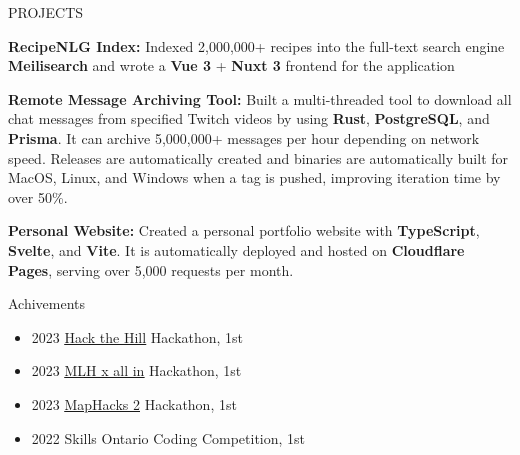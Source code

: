 \documentclass{resume}
\begin{document}
\begin{rSection}{PROJECTS}
	\vspace{-1.25em}

	\item \textbf{RecipeNLG Index:} {Indexed 2,000,000+ recipes into the full-text search engine \textbf{Meilisearch} and wrote a \textbf{Vue 3} + \textbf{Nuxt 3} frontend for the application}

	\item \textbf{Remote Message Archiving Tool:} {Built a multi-threaded tool to download all chat messages from specified Twitch videos by using \textbf{Rust}, \textbf{PostgreSQL}, and \textbf{Prisma}. It can archive 5,000,000+ messages per hour depending on network speed. Releases are automatically created and binaries are automatically built for MacOS, Linux, and Windows when a tag is pushed, improving iteration time by over 50\%.}

	\item \textbf{Personal Website:} {Created a personal portfolio website with \textbf{TypeScript}, \textbf{Svelte}, and \textbf{Vite}. It is automatically deployed and hosted on \textbf{Cloudflare Pages}, serving over 5,000 requests per month.}

\end{rSection}

\begin{rSection}{Achivements}
	\begin{itemize}
		\item	2023 \underline{\href{https://hack-the-hill.devpost.com}{Hack the Hill}} Hackathon, 1st
		\item 2023 \underline{\href{https://all-in-hackathon.devpost.com/}{MLH x \textbraceleft all in\textbraceright}} Hackathon, 1st
		\item 2023 \underline{\href{https://maphacks-2.devpost.com}{MapHacks 2}} Hackathon, 1st
		\item	2022 Skills Ontario Coding Competition, 1st
	\end{itemize}
\end{rSection}
\end{document}

